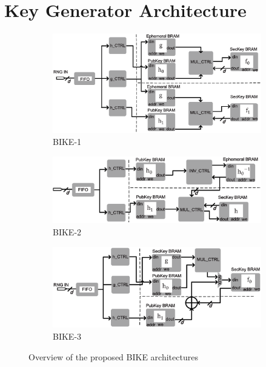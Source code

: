 \documentclass[runningheads]{llncs}
\begin{document}
\section{Key Generator Architecture}
\label{sec::keygen}

\begin{figure}[!tb]
\centering
\begin{subfigure}[t]{0.47\textwidth}\centering
\includegraphics[width=\textwidth]{./fig/BIKE-1.eps}
\caption{BIKE-1}
\label{fig:bike1}
\end{subfigure}
\hspace{1em}
\begin{subfigure}[t]{0.47\textwidth}\centering
\includegraphics[width=\textwidth]{./fig/BIKE-2.eps}
\caption{BIKE-2 }
\label{fig:bike2}
\end{subfigure}
\begin{subfigure}[t]{0.47\textwidth}\centering
\includegraphics[width=\textwidth]{./fig/BIKE-3.eps}
\caption{BIKE-3 }
\label{fig:bike3}
\end{subfigure}
\caption{Overview of the proposed BIKE architectures}
\end{figure}
\end{document}
